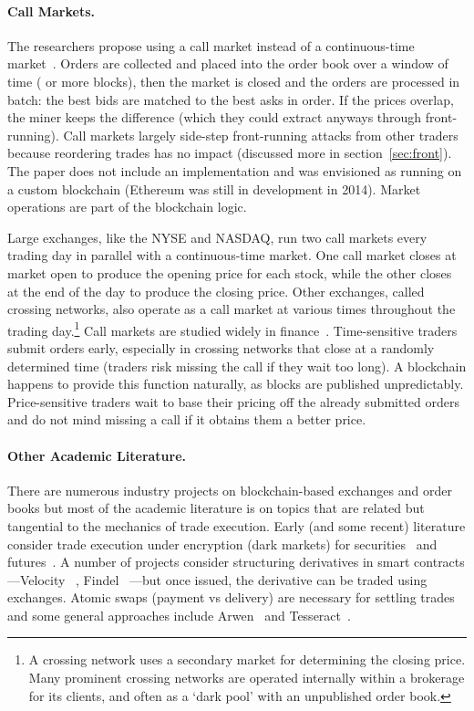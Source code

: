 \paragraph{Call Markets.} The researchers propose using a call market instead of a continuous-time market~\cite{clark2014decentralizing}. Orders are collected and placed into the order book over a window of time ( or more blocks), then the market is closed and the orders are processed in batch: the best bids are matched to the best asks in order. If the prices overlap, the miner keeps the difference (which they could extract anyways through front-running). Call markets largely side-step front-running attacks from other traders because reordering trades has no impact (discussed more in section~\ref{sec:front}). The paper does not include an implementation and was envisioned as running on a custom blockchain (Ethereum was still in development in 2014). Market operations are part of the blockchain logic.

Large exchanges, like the NYSE and NASDAQ, run two call markets every trading day in parallel with a continuous-time market. One call market closes at market open to produce the opening price for each stock, while the other closes at the end of the day to produce the closing price. Other exchanges, called crossing networks, also operate as a call market at various times throughout the trading day.\footnote{A crossing network uses a secondary market for determining the closing price. Many prominent crossing networks are operated internally within a brokerage for its clients, and often as a `dark pool' with an unpublished order book.} Call markets are studied widely in finance~\cite{Har03}. Time-sensitive traders submit orders early, especially in crossing networks that close at a randomly determined time (traders risk missing the call if they wait too long). A blockchain happens to provide this function naturally, as blocks are published unpredictably. Price-sensitive traders wait to base their pricing off the already submitted orders and do not mind missing a call if it obtains them a better price. 

\paragraph{Other Academic Literature.} There are numerous industry projects on blockchain-based exchanges and order books but most of the academic literature is on topics that are related but tangential to the mechanics of trade execution. Early (and some recent) literature consider trade execution under encryption (\ie dark markets) for securities~\cite{TP07,YSLT10,TW12,cartlidge2019mpc} and futures~\cite{massacci2018futuresmex}. A number of projects consider structuring derivatives in smart contracts---Velocity ~\cite{eskandari2017feasibility}, Findel ~\cite{biryukov2017findel}---but once issued, the derivative can be traded using exchanges. Atomic swaps (\ie payment vs delivery) are necessary for settling trades and some general approaches include Arwen~\cite{heilman2020arwen} and Tesseract~\cite{bentov2017tesseract}.

